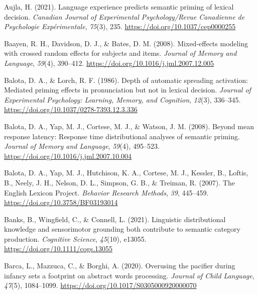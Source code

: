 \documentclass[
  12pt,
  man,floatsintext]{apa7}
\newlength{\cslhangindent}
\newlength{\cslentryspacingunit} %
\newenvironment{CSLReferences}[2] %
 {%
  \setlength{\parindent}{0pt}
  \ifodd #1
  \let\oldpar\par
  \def\par{\hangindent=\cslhangindent\oldpar}
  \fi
  \setlength{\parskip}{#2\cslentryspacingunit}
 }%
 {}
\begin{document}
\begin{CSLReferences}{1}{0}
\leavevmode{}%
Aujla, H. (2021). Language experience predicts semantic priming of lexical decision. \emph{Canadian Journal of Experimental Psychology/Revue Canadienne de Psychologie Expérimentale}, \emph{75}(3), 235. \url{https://doi.org/10.1037/cep0000255}

\leavevmode{}%
Baayen, R. H., Davidson, D. J., \& Bates, D. M. (2008). Mixed-effects modeling with crossed random effects for subjects and items. \emph{Journal of Memory and Language}, \emph{59}(4), 390--412. \url{https://doi.org/10.1016/j.jml.2007.12.005}

\leavevmode{}%
Balota, D. A., \& Lorch, R. F. (1986). Depth of automatic spreading activation: {Mediated} priming effects in pronunciation but not in lexical decision. \emph{Journal of Experimental Psychology: Learning, Memory, and Cognition}, \emph{12}(3), 336--345. \url{https://doi.org/10.1037/0278-7393.12.3.336}

\leavevmode{}%
Balota, D. A., Yap, M. J., Cortese, M. J., \& Watson, J. M. (2008). Beyond mean response latency: {Response} time distributional analyses of semantic priming. \emph{Journal of Memory and Language}, \emph{59}(4), 495--523. \url{https://doi.org/10.1016/j.jml.2007.10.004}

\leavevmode{}%
Balota, D. A., Yap, M. J., Hutchison, K. A., Cortese, M. J., Kessler, B., Loftis, B., Neely, J. H., Nelson, D. L., Simpson, G. B., \& Treiman, R. (2007). The {English Lexicon Project}. \emph{Behavior Research Methods}, \emph{39}, 445--459. \url{https://doi.org/10.3758/BF03193014}

\leavevmode{}%
Banks, B., Wingfield, C., \& Connell, L. (2021). Linguistic distributional knowledge and sensorimotor grounding both contribute to semantic category production. \emph{Cognitive Science}, \emph{45}(10), e13055. \url{https://doi.org/10.1111/cogs.13055}

\leavevmode{}%
Barca, L., Mazzuca, C., \& Borghi, A. (2020). Overusing the pacifier during infancy sets a footprint on abstract words processing. \emph{Journal of Child Language}, \emph{47}(5), 1084--1099. \url{https://doi.org/10.1017/S0305000920000070}


\end{CSLReferences}
\end{document}
